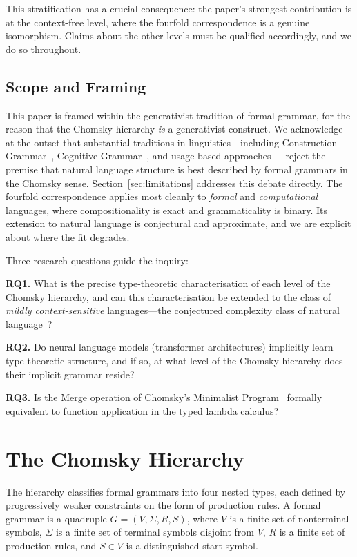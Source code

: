 \documentclass[12pt,a4paper]{article}
\begin{document}
This stratification has a crucial consequence: the paper's strongest
contribution is at the context-free level, where the fourfold correspondence
is a genuine isomorphism. Claims about the other levels must be qualified
accordingly, and we do so throughout.

\subsection{Scope and Framing}

This paper is framed within the generativist tradition of formal grammar, for
the reason that the Chomsky hierarchy \emph{is} a generativist construct. We
acknowledge at the outset that substantial traditions in linguistics---including
Construction Grammar~\cite{Goldberg1995,Goldberg2006}, Cognitive
Grammar~\cite{Langacker1987,Langacker2008}, and usage-based
approaches~\cite{Bybee2006,Bybee2010}---reject the premise that natural
language structure is best described by formal grammars in the Chomsky sense.
Section~\ref{sec:limitations} addresses this debate directly. The fourfold
correspondence applies most cleanly to \emph{formal} and \emph{computational}
languages, where compositionality is exact and grammaticality is binary. Its
extension to natural language is conjectural and approximate, and we are
explicit about where the fit degrades.

Three research questions guide the inquiry:

\textbf{RQ1.} What is the precise type-theoretic characterisation of each
level of the Chomsky hierarchy, and can this characterisation be extended to
the class of \emph{mildly context-sensitive} languages---the conjectured
complexity class of natural language~\cite{Joshi1985}?

\textbf{RQ2.} Do neural language models (transformer architectures) implicitly
learn type-theoretic structure, and if so, at what level of the Chomsky
hierarchy does their implicit grammar reside?

\textbf{RQ3.} Is the Merge operation of Chomsky's Minimalist
Program~\cite{Chomsky1995} formally equivalent to function application in the
typed lambda calculus?

\section{The Chomsky Hierarchy}

The hierarchy classifies formal grammars into four nested types, each defined
by progressively weaker constraints on the form of production rules. A formal
grammar is a quadruple $G = (V, \Sigma, R, S)$, where $V$ is a finite set of
nonterminal symbols, $\Sigma$ is a finite set of terminal symbols disjoint
from $V$, $R$ is a finite set of production rules, and $S \in V$ is a
distinguished start symbol.
\end{document}
